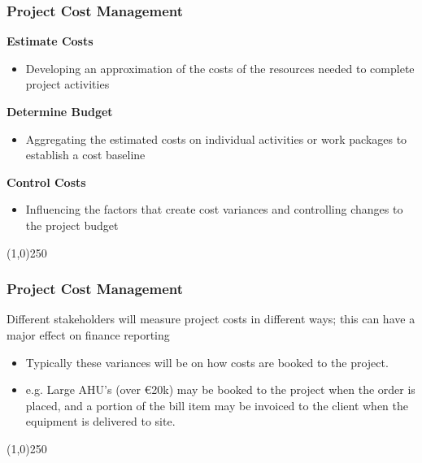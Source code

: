 \begin{frame}
\frametitle{Project Cost Management}
\textbf{Estimate Costs}
\begin{itemize}
	\item Developing an approximation of the costs of the resources needed to complete project activities
\end{itemize}
\textbf{Determine Budget}
\begin{itemize}
	\item Aggregating the estimated costs on individual activities or work packages to establish a cost baseline
\end{itemize}
\textbf{Control Costs}
\begin{itemize}
	\item Influencing the factors that create cost variances and controlling changes to the project budget
\end{itemize}
\end{frame}
\begin{center}\line(1,0){250}\end{center}





\begin{frame}
\frametitle{Project Cost Management}
Different stakeholders will measure project costs in different ways; this can have a major effect on finance reporting
\begin{itemize}
	\item Typically these variances will be on how costs are booked to the project.

	\item e.g. Large AHU’s (over \euro20k) may be booked to the project when the order is placed, and a portion of the bill item may be invoiced to the client when the equipment is delivered to site.
\end{itemize}
\end{frame}
\begin{center}\line(1,0){250}\end{center}







